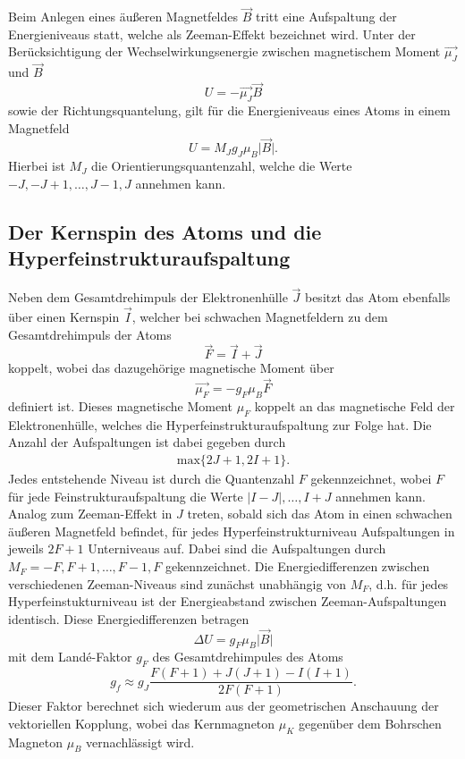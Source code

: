 Beim Anlegen eines äußeren Magnetfeldes $\vec{B}$ tritt eine Aufspaltung der Energieniveaus statt, welche als Zeeman-Effekt bezeichnet wird.
Unter der Berücksichtigung der Wechselwirkungsenergie zwischen magnetischem Moment $\vec{\mu_J}$ und $\vec{B}$
\begin{equation}
  U = - \vec{\mu_J} \vec{B}
\end{equation}
sowie der Richtungsquantelung, gilt für die Energieniveaus eines Atoms in einem Magnetfeld
\begin{equation}
  U = M_J g_J \mu_B \lvert \vec{B} \rvert.
\end{equation}
Hierbei ist $M_J$ die Orientierungsquantenzahl, welche die Werte $-J, -J+1 , \dotsc , J-1, J$ annehmen kann.

\subsection{Der Kernspin des Atoms und die Hyperfeinstrukturaufspaltung}

Neben dem Gesamtdrehimpuls der Elektronenhülle $\vec{J}$ besitzt das Atom ebenfalls über einen Kernspin $\vec{I}$, welcher bei schwachen Magnetfeldern zu dem Gesamtdrehimpuls der Atoms
\begin{equation}
  \vec{F} = \vec{I} + \vec{J}
\end{equation}
koppelt, wobei das dazugehörige magnetische Moment über
\begin{equation}
  \vec{\mu_F} = - g_F \mu_B \vec{F}
\end{equation}
definiert ist.
Dieses magnetische Moment $\mu_F$ koppelt an das magnetische Feld der Elektronenhülle, welches die Hyperfeinstrukturaufspaltung zur Folge hat.
Die Anzahl der Aufspaltungen ist dabei gegeben durch
\begin{align*}
  \text{max} \{ 2J+1, 2I+1 \}.
\end{align*}
Jedes entstehende Niveau ist durch die Quantenzahl $F$ gekennzeichnet, wobei $F$ für jede Feinstrukturaufspaltung die Werte $\lvert I-J \rvert, \dotsc, I+J$ annehmen kann.\\
Analog zum Zeeman-Effekt in $J$ treten, sobald sich das Atom in einen schwachen äußeren Magnetfeld befindet, für jedes Hyperfeinstrukturniveau Aufspaltungen in jeweils $2F+1$ Unterniveaus auf.
Dabei sind die Aufspaltungen durch $M_F = -F, F+1, \dotsc, F-1, F$ gekennzeichnet.
Die Energiedifferenzen zwischen verschiedenen Zeeman-Niveaus sind zunächst unabhängig von $M_F$, d.h. für jedes Hyperfeinstukturniveau ist der Energieabstand zwischen Zeeman-Aufspaltungen identisch.
Diese Energiedifferenzen betragen
\begin{equation}
  \Delta U = g_F \mu_B \lvert \vec{B} \rvert
  \label{eqn:0}
\end{equation}
mit dem Land\'{e}-Faktor $g_F$ des Gesamtdrehimpules des Atoms
\begin{equation}
  \label{eqn:gruen}
  g_f \approx g_J \frac{ F \left( F+1 \right) + J \left( J+1 \right) - I \left( I+1 \right)}{2F \left( F+1 \right)}.
\end{equation}
Dieser Faktor berechnet sich wiederum aus der geometrischen Anschauung der vektoriellen Kopplung, wobei das Kernmagneton $\mu_K$ gegenüber dem Bohrschen Magneton $\mu_B$ vernachlässigt wird.

